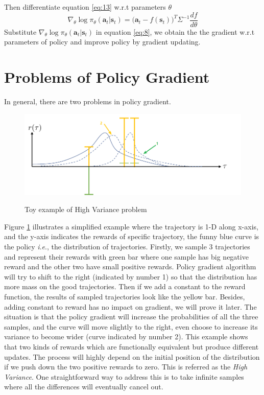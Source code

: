 \documentclass{tufte-handout}
\newcommand{\ie}{\textit{i}.\textit{e}., }
\newcommand{\s}{\mathbf{s}}
\newcommand{\act}{\mathbf{a}}
\begin{document}
\indent Then differentiate equation \ref{eq:13} w.r.t parameters $\theta$
\begin{equation}
\label{eq:17}
\nabla_\theta \log \pi_\theta(\act_t| \s_t) = \big(\act_t - f(\s_t) \big) ^T \Sigma ^{-1} \frac{df}{d\theta}
\end{equation}
\indent Substitute $\nabla_\theta \log \pi_\theta(\act_t| \s_t)$ in equation \ref{eq:8}, we obtain the the gradient w.r.t parameters of policy and improve policy by gradient updating.

\section{Problems of Policy Gradient}
In general, there are two problems in policy gradient.


\begin{figure}
\caption{Toy example of High Variance problem}
\includegraphics[width=14cm]{variance}
\label{fig:variance}

\end{figure}

Figure \ref{fig:variance} illustrates a simplified example where the trajectory is 1-D along x-axis, and the y-axis indicates the rewards of specific trajectory, the funny blue curve is the policy \ie the distribution of trajectories. Firstly, we sample 3 trajectories and represent their rewards with green bar where one sample has big negative reward and the other two have small positive rewards. Policy gradient algorithm will try to shift to the right (indicated by number 1) so that the distribution has more mass on the good trajectories. Then if we add a constant to the reward function, the results of sampled trajectories look like the yellow bar. Besides, adding constant to reward has no impact on gradient, we will prove it later. The situation is that the policy gradient will increase the probabilities of all the three samples, and the curve will move slightly to the right, even choose to increase its variance to become wider
(curve indicated by number 2). This example shows that two kinds of rewards which are functionally equivalent but produce different updates. The process will highly depend on the initial position of the distribution if we push down the two positive rewards to zero. This is referred as the \emph{High Variance}. One straightforward way to address this is to take infinite samples where all the differences will eventually cancel out.
\end{document}
